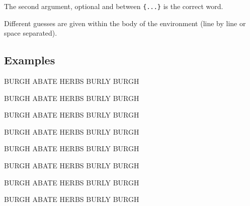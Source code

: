 \documentclass[english,a4paper,11pt]{article}
\begin{document}
{\begin{tipblock}
The second argument, optional and between \texttt{\{...\}} is the correct word.

\smallskip

Different guesses are given within the body of the environment (line by line or space separated).
\end{tipblock}

\subsection{Examples}

\begin{DemoCode}[]
\begin{WordleGrid}{BURGH}
	ABATE
	HERBS
	BURLY
	BURGH
\end{WordleGrid}
%
\hspace{5mm}
%
\begin{WordleGrid}[Style=alt]{BURGH}
	ABATE HERBS BURLY BURGH
\end{WordleGrid}
\end{DemoCode}

\begin{DemoCode}[]
\begin{WordleGrid}
		[Thickness=0.3,BorderColor=black,%
		Colors={lightgray,orange,teal}]{BURGH}
	ABATE
	HERBS
	BURLY
	BURGH
\end{WordleGrid}
%
\hspace{5mm}
%
\begin{WordleGrid}
		[Rounded=0,Thickness=0.3,BorderColor=black,%
		Colors={lightgray,orange,teal}]{BURGH}
	ABATE
	HERBS
	BURLY
	BURGH
\end{WordleGrid}
\end{DemoCode}

\begin{DemoCode}[]
\begin{WordleGrid}[Unit=2,Font=\Huge\ttfamily,ColorLetters=black]{BURGH}
	ABATE
	HERBS
	BURLY
	BURGH
\end{WordleGrid}
\end{DemoCode}

\begin{DemoCode}[]
\begin{WordleGrid}%
		[Unit=0.75,Rounded=0,Colors={cyan,orange,violet},Letters=false]{BURGH}
	ABATE
	HERBS
	BURLY
	BURGH
\end{WordleGrid}
\hspace{5mm}
\begin{WordleGrid}%
		[Unit=0.75,Rounded=0,Colors={cyan,orange,violet},Style=alt]
		{BURGH}
	ABATE
	HERBS
	BURLY
	BURGH
\end{WordleGrid}
\hspace{5mm}
\begin{WordleGrid}%
		[Unit=0.75,Rounded=0,Colors={cyan,orange,violet},Style=alt,Letters=false]
		{BURGH}
	ABATE
	HERBS
	BURLY
	BURGH
\end{WordleGrid}
\end{DemoCode}

}
\end{document}
